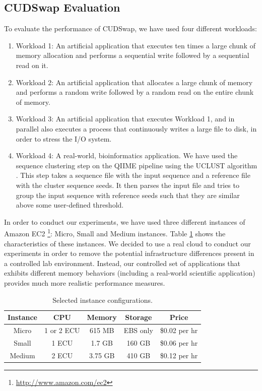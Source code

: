 \subsection{CUDSwap Evaluation}\label{sub_cudswap_Evaluation}

To evaluate the performance of CUDSwap, we have used four different workloads:
\begin{enumerate}
\item Workload 1: An artificial application that executes ten times a large
chunk of memory allocation and performs a sequential write followed by a
sequential read on it.

\item Workload 2: An artificial application that allocates a large chunk of
memory and performs a random write followed by a random read on the entire
chunk of memory.

\item Workload 3: An artificial application that executes Workload 1, and
in parallel also executes a process that continuously writes a large file
to disk, in order to stress the I/O system.

\item Workload 4: A real-world, bioinformatics application. We have used
the sequence clustering step on the QIIME pipeline \cite{Caporaso2010}
using the
UCLUST algorithm \cite{Edgar2010}. This step takes a sequence file with the
input sequence and a reference file with the cluster sequence seeds. It
then parses the input file and tries to group the input sequence with
reference seeds such that they are similar above some user-defined threshold.
\end{enumerate}

In order to conduct our experiments, we have used three different instances
of Amazon EC2 \footnote{\url{http://www.amazon.com/ec2}}: Micro, Small and Medium instances. Table
\ref{cudswaptable1} shows the characteristics of these instances. We decided
to use a real cloud to conduct our experiments in order to remove the potential
infrastructure differences present in a controlled lab environment. Instead,
our controlled set of applications that exhibits different memory behaviors
(including a real-world scientific application) provides much more realistic
performance measures.

\begin{table}[htbp]
\centering
\caption[Selected instance configurations]{Selected instance configurations.}\label{cudswaptable1}
\begin{tabular*}{\textwidth}{ccccc}
\toprule
Instance & CPU & Memory & Storage & Price\\
\midrule
Micro & 1 or 2 ECU & 615 MB & EBS only & \$0.02 per hr\\
\midrule
Small & 1 ECU & 1.7 GB & 160 GB & \$0.06 per hr\\
\midrule
Medium & 2 ECU & 3.75 GB & 410 GB & \$0.12 per hr\\
\bottomrule
\end{tabular*}
\end{table}

